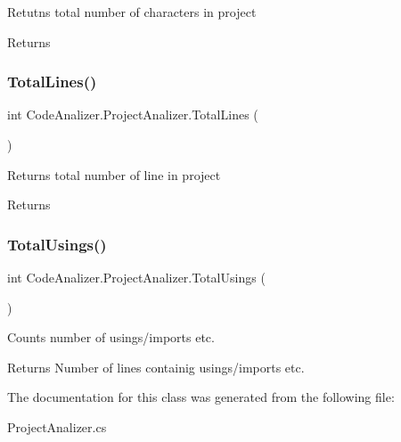 Retutns total number of characters in project 

\begin{DoxyReturn}{Returns}

\end{DoxyReturn}
\mbox{\label{class_code_analizer_1_1_project_analizer_aad0869b232a62de023d48dda1edb9766}} 
\subsubsection{\texorpdfstring{Total\+Lines()}{TotalLines()}}
{\footnotesize\ttfamily int Code\+Analizer.\+Project\+Analizer.\+Total\+Lines (\begin{DoxyParamCaption}{ }\end{DoxyParamCaption})}



Returns total number of line in project 

\begin{DoxyReturn}{Returns}

\end{DoxyReturn}
\mbox{\label{class_code_analizer_1_1_project_analizer_a6b4d14436cbf5a7bdfe24870fe2209d7}} 
\subsubsection{\texorpdfstring{Total\+Usings()}{TotalUsings()}}
{\footnotesize\ttfamily int Code\+Analizer.\+Project\+Analizer.\+Total\+Usings (\begin{DoxyParamCaption}{ }\end{DoxyParamCaption})}



Counts number of usings/imports etc. 

\begin{DoxyReturn}{Returns}
Number of lines containig usings/imports etc.
\end{DoxyReturn}


The documentation for this class was generated from the following file\+:\begin{DoxyCompactItemize}
\item 
Project\+Analizer.\+cs\end{DoxyCompactItemize}
